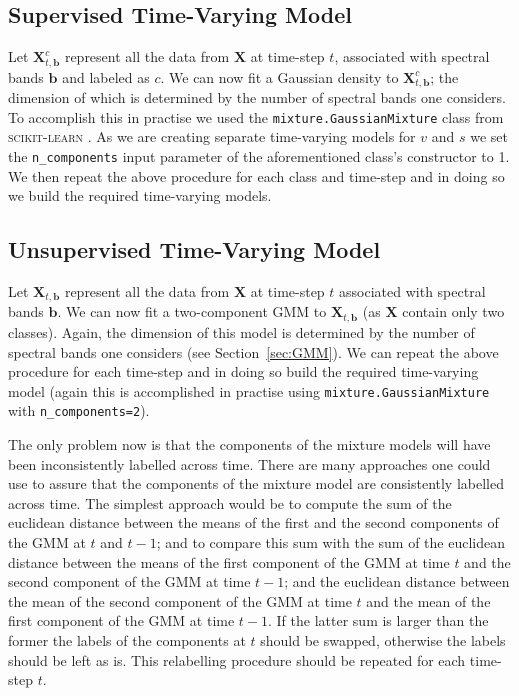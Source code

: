 \documentclass{article}
\begin{document}
\subsection{Supervised Time-Varying Model}
\label{sec:sup_model}
Let $\mathbf{X}_{t,\mathbf{b}}^c$ represent all the data from $\mathbf{X}$ at time-step $t$, associated with spectral bands $\mathbf{b}$ and labeled as $c$. We can now fit a Gaussian density 
to $\mathbf{X}_{t,\mathbf{b}}^c$; the dimension of which is determined by the number of spectral bands one considers. To accomplish this in practise we used the \texttt{mixture.GaussianMixture} class from \textsc{scikit-learn} \cite{scikitlearn}. 
As we are creating separate time-varying models for $v$ and $s$ we set the \texttt{n\_components} input parameter of the aforementioned class's constructor to 1. We then repeat the above procedure for each class and time-step and in 
doing so we build the required time-varying models. %

\subsection{Unsupervised Time-Varying Model}
Let $\mathbf{X}_{t,\mathbf{b}}$ represent all the data from $\mathbf{X}$ at time-step $t$ associated with spectral bands $\mathbf{b}$. We can now fit a two-component GMM to $\mathbf{X}_{t,\mathbf{b}}$ (as $\mathbf{X}$ contain only two classes). Again,
the dimension of this model is determined by the number of spectral bands one considers (see Section~\ref{sec:GMM}). We can repeat the above procedure for each time-step and in doing so 
build the required time-varying model (again this is accomplished in practise using \texttt{mixture.GaussianMixture} with \texttt{n\_components=2}). 

The only problem now is that the components of the mixture models will have been inconsistently labelled across time. There are many approaches one could use to assure 
that the components of the mixture model are consistently labelled across time. The simplest approach would be to compute the sum of the euclidean distance between the means of 
the first and the second components of the GMM at $t$ and $t-1$; and to compare this sum with the sum of the euclidean distance between the means of the first component of the GMM at time $t$ and 
the second component of the GMM at time $t-1$; and the euclidean distance between the mean of the second component of the GMM at time $t$ and the mean of the first component of the GMM at time $t-1$. If the latter sum is 
larger than the former the labels of the components at $t$ should be swapped, otherwise the labels should be left as is. This relabelling procedure should be repeated for each time-step $t$.
\end{document}
